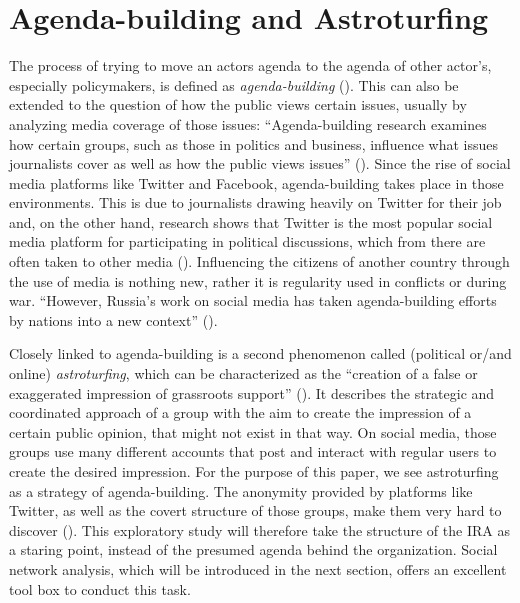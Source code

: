 \documentclass[12pt, titlepage=true, toc=bib]{scrartcl}
\begin{document}
\section{Agenda-building and Astroturfing}

The process of trying to move an actors agenda to the agenda of other actor's, especially policymakers, is defined as \textit{agenda-building} (\cite[3]{linvill_troll_2018}). This can also be extended to the question of how the public views certain issues, usually by analyzing media coverage of those issues: ``Agenda-building research examines how certain groups, such as those in politics and business, influence what issues journalists cover as well as how the public views issues'' (\cite[434]{parmelee_agenda-building_2014}). Since the rise of social media platforms like Twitter and Facebook, agenda-building takes place in those environments. This is due to journalists drawing heavily on Twitter for their job and, on the other hand, research shows that Twitter is the most popular social media platform for participating in political discussions, which from there are often taken to other media (\cite[435, 437]{parmelee_agenda-building_2014}). Influencing the citizens of another country through the use of media is nothing new, rather it is regularity used in conflicts or during war. ``However, Russia's work on social media has taken agenda-building efforts by nations into a new context'' (\cite[3]{linvill_troll_2018}).

Closely linked to agenda-building is a second phenomenon called (political or/and online) \textit{astroturfing}, which can be characterized as the ``creation of a false or exaggerated impression of grassroots support'' (\cite{harcup_astroturfing_2014}). It describes the strategic and coordinated approach of a group with the aim to create the impression of a certain public opinion, that might not exist in that way. On social media, those groups use many different accounts that post and interact with regular users to create the desired impression. For the purpose of this paper, we see astroturfing as a strategy of agenda-building. The anonymity provided by platforms like Twitter, as well as the covert structure of those groups, make them very hard to discover (\cite[564]{yang_how_2017}). This exploratory study will therefore take the structure of the IRA as a staring point, instead of the presumed agenda behind the organization. Social network analysis, which will be introduced in the next section, offers an excellent tool box to conduct this task.
\end{document}
